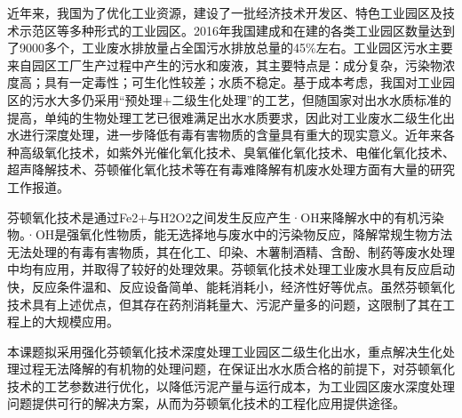 近年来，我国为了优化工业资源，建设了一批经济技术开发区、特色工业园区及技术示范区等多种形式的工业园区。2016年我国建成和在建的各类工业园区数量达到了9000多个，工业废水排放量占全国污水排放总量的45\%左右。工业园区污水主要来自园区工厂生产过程中产生的污水和废液，其主要特点是：成分复杂，污染物浓度高；具有一定毒性；可生化性较差；水质不稳定。基于成本考虑，我国对工业园区的污水大多仍采用“预处理+二级生化处理”的工艺，但随国家对出水水质标准的提高，单纯的生物处理工艺已很难满足出水水质要求，因此对工业废水二级生化出水进行深度处理，进一步降低有毒有害物质的含量具有重大的现实意义。近年来各种高级氧化技术，如紫外光催化氧化技术、臭氧催化氧化技术、电催化氧化技术、超声降解技术、芬顿催化氧化技术等在有毒难降解有机废水处理方面有大量的研究工作报道。\par
芬顿氧化技术是通过Fe2+与H2O2之间发生反应产生·OH来降解水中的有机污染物。·OH是强氧化性物质，能无选择地与废水中的污染物反应，降解常规生物方法无法处理的有毒有害物质，其在化工\cite{hujie_2015}、印染\cite{wangping_2015}、木薯制酒精\cite{shiqiang_2015}、含酚\cite{liyang_2017}、制药\cite{zengping_2017}等废水处理中均有应用，并取得了较好的处理效果。芬顿氧化技术处理工业废水具有反应启动快，反应条件温和、反应设备简单、能耗消耗小，经济性好等优点。虽然芬顿氧化技术具有上述优点，但其存在药剂消耗量大、污泥产量多的问题，这限制了其在工程上的大规模应用。\par
本课题拟采用强化芬顿氧化技术深度处理工业园区二级生化出水，重点解决生化处理过程无法降解的有机物的处理问题，在保证出水水质合格的前提下，对芬顿氧化技术的工艺参数进行优化，以降低污泥产量与运行成本，为工业园区废水深度处理问题提供可行的解决方案，从而为芬顿氧化技术的工程化应用提供途径。\par